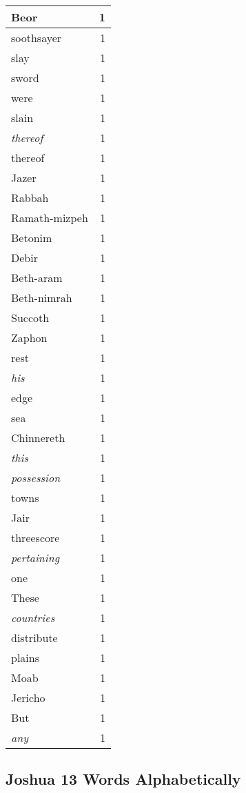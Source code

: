 \begin{center}
\begin{longtable}{l|r}
Beor & 1\\ \hline 
soothsayer & 1\\ \hline 
slay & 1\\ \hline 
sword & 1\\ \hline 
were & 1\\ \hline 
slain & 1\\ \hline 
\emph{thereof} & 1\\ \hline 
thereof & 1\\ \hline 
Jazer & 1\\ \hline 
Rabbah & 1\\ \hline 
Ramath-mizpeh & 1\\ \hline 
Betonim & 1\\ \hline 
Debir & 1\\ \hline 
Beth-aram & 1\\ \hline 
Beth-nimrah & 1\\ \hline 
Succoth & 1\\ \hline 
Zaphon & 1\\ \hline 
rest & 1\\ \hline 
\emph{his} & 1\\ \hline 
edge & 1\\ \hline 
sea & 1\\ \hline 
Chinnereth & 1\\ \hline 
\emph{this} & 1\\ \hline 
\emph{possession} & 1\\ \hline 
towns & 1\\ \hline 
Jair & 1\\ \hline 
threescore & 1\\ \hline 
\emph{pertaining} & 1\\ \hline 
one & 1\\ \hline 
These & 1\\ \hline 
\emph{countries} & 1\\ \hline 
distribute & 1\\ \hline 
plains & 1\\ \hline 
Moab & 1\\ \hline 
Jericho & 1\\ \hline 
But & 1\\ \hline 
\emph{any} & 1\\ \hline 
\end{longtable}
\end{center}





\subsection{Joshua 13 Words Alphabetically}


